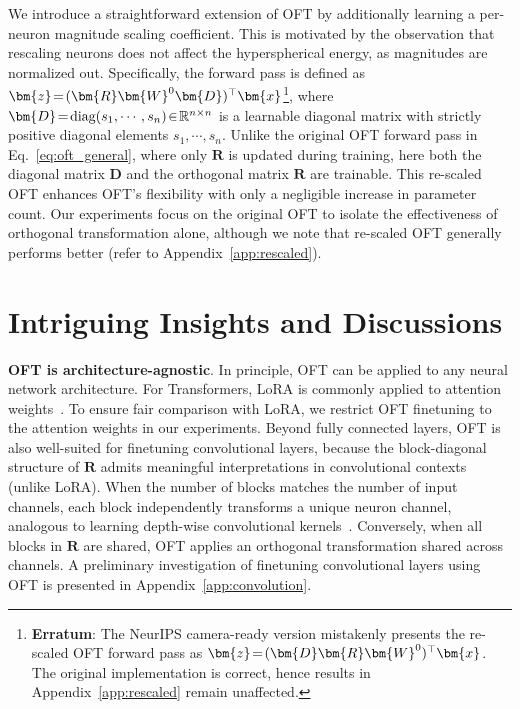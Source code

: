 We introduce a straightforward extension of OFT by additionally learning a per-neuron magnitude scaling coefficient. This is motivated by the observation that rescaling neurons does not affect the hyperspherical energy, as magnitudes are normalized out. Specifically, the forward pass is defined as $\thickmuskip=2mu \medmuskip=2mu\bm{z}=(\bm{R}\bm{W}^0\bm{D})^\top\bm{x}$\footnote{\textbf{Erratum}: The NeurIPS camera-ready version mistakenly presents the re-scaled OFT forward pass as $\thickmuskip=2mu \medmuskip=2mu\bm{z}=(\bm{D}\bm{R}\bm{W}^0)^\top\bm{x}$. The original implementation is correct, hence results in Appendix~\ref{app:rescaled} remain unaffected.}, where $\thickmuskip=2mu \medmuskip=2mu \bm{D}=\text{diag}(s_1,\cdots,s_n)\in\mathbb{R}^{n\times n}$ is a learnable diagonal matrix with strictly positive diagonal elements $s_1,\cdots,s_n$. Unlike the original OFT forward pass in Eq.~\eqref{eq:oft_general}, where only $\bm{R}$ is updated during training, here both the diagonal matrix $\bm{D}$ and the orthogonal matrix $\bm{R}$ are trainable. This re-scaled OFT enhances OFT’s flexibility with only a negligible increase in parameter count. Our experiments focus on the original OFT to isolate the effectiveness of orthogonal transformation alone, although we note that re-scaled OFT generally performs better (refer to Appendix~\ref{app:rescaled}).

\section{Intriguing Insights and Discussions}

\textbf{OFT is architecture-agnostic}. In principle, OFT can be applied to any neural network architecture. For Transformers, LoRA is commonly applied to attention weights~\cite{hulora2022}. To ensure fair comparison with LoRA, we restrict OFT finetuning to the attention weights in our experiments. Beyond fully connected layers, OFT is also well-suited for finetuning convolutional layers, because the block-diagonal structure of $\bm{R}$ admits meaningful interpretations in convolutional contexts (unlike LoRA). When the number of blocks matches the number of input channels, each block independently transforms a unique neuron channel, analogous to learning depth-wise convolutional kernels~\cite{chollet2017xception}. Conversely, when all blocks in $\bm{R}$ are shared, OFT applies an orthogonal transformation shared across channels. A preliminary investigation of finetuning convolutional layers using OFT is presented in Appendix~\ref{app:convolution}.

